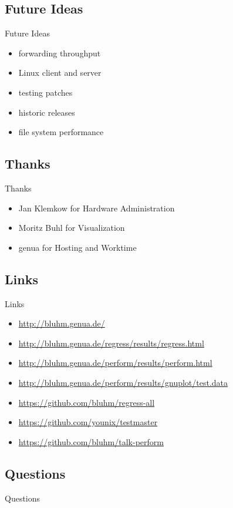 \documentclass[14pt,aspectratio=169]{beamer}
\begin{document}
\subsection{Future Ideas}
\begin{frame}{Future Ideas}
\begin{itemize}
    \item forwarding throughput
    \item Linux client and server
    \item testing patches
    \item historic releases
    \item file system performance
\end{itemize}
\end{frame}

\subsection{Thanks}
\begin{frame}{Thanks}
\begin{itemize}
    \item Jan Klemkow for Hardware Administration
    \item Moritz Buhl for Visualization
    \item genua for Hosting and Worktime
\end{itemize}
\end{frame}

\subsection{Links}
\begin{frame}{Links}
\begin{itemize}
    \small
    \item \url{http://bluhm.genua.de/}
    \item \url{http://bluhm.genua.de/regress/results/regress.html}
    \item \url{http://bluhm.genua.de/perform/results/perform.html}
    \item \url{http://bluhm.genua.de/perform/results/gnuplot/test.data}
    \item \url{https://github.com/bluhm/regress-all}
    \item \url{https://github.com/younix/testmaster}
    \item \url{https://github.com/bluhm/talk-perform}
\end{itemize}
\end{frame}

\subsection{Questions}
\begin{frame}{Questions}
\begin{center}
\end{center}
\end{frame}
\end{document}
